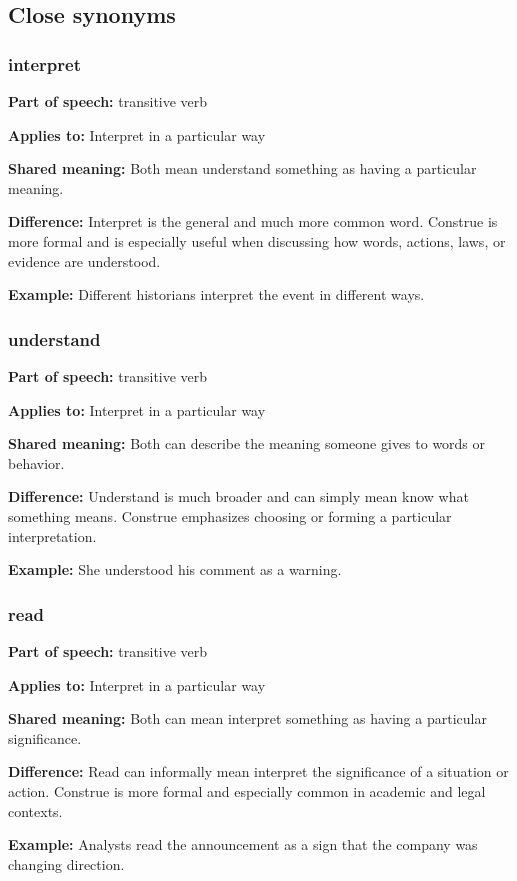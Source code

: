 \documentclass[11pt]{article}
\begin{document}
\subsection{Close synonyms}
\subsubsection{interpret}
\textbf{Part of speech:} transitive verb

\textbf{Applies to:} Interpret in a particular way

\textbf{Shared meaning:} Both mean understand something as having a particular meaning.

\textbf{Difference:} Interpret is the general and much more common word. Construe is more formal and is especially useful when discussing how words, actions, laws, or evidence are understood.

\textbf{Example:} Different historians interpret the event in different ways.

\subsubsection{understand}
\textbf{Part of speech:} transitive verb

\textbf{Applies to:} Interpret in a particular way

\textbf{Shared meaning:} Both can describe the meaning someone gives to words or behavior.

\textbf{Difference:} Understand is much broader and can simply mean know what something means. Construe emphasizes choosing or forming a particular interpretation.

\textbf{Example:} She understood his comment as a warning.

\subsubsection{read}
\textbf{Part of speech:} transitive verb

\textbf{Applies to:} Interpret in a particular way

\textbf{Shared meaning:} Both can mean interpret something as having a particular significance.

\textbf{Difference:} Read can informally mean interpret the significance of a situation or action. Construe is more formal and especially common in academic and legal contexts.

\textbf{Example:} Analysts read the announcement as a sign that the company was changing direction.
\end{document}
